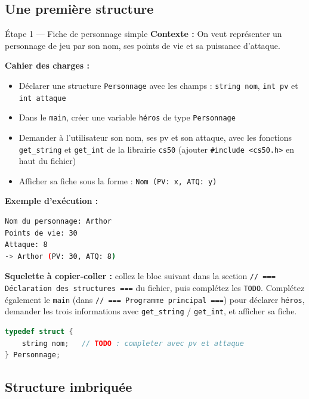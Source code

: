 \subsection{Une première structure}

\begin{UPSTIManipulation}{Étape 1 — Fiche de personnage simple}
  \textbf{Contexte :} On veut représenter un personnage de jeu par son nom, ses points de vie
  et sa puissance d'attaque.

  \textbf{Cahier des charges :}
  \begin{itemize}
    \item Déclarer une structure \texttt{Personnage} avec les champs : \texttt{string nom},
      \texttt{int pv} et \texttt{int attaque}
    \item Dans le \texttt{main}, créer une variable \texttt{héros} de type \texttt{Personnage}
    \item Demander à l'utilisateur son nom, ses pv et son attaque, avec les fonctions
      \texttt{get\_string} et \texttt{get\_int} de la librairie \texttt{cs50} (ajouter
      \texttt{\#include <cs50.h>} en haut du fichier)
    \item Afficher sa fiche sous la forme : \texttt{Nom (PV: x, ATQ: y)}
  \end{itemize}

  \textbf{Exemple d'exécution :}
  \begin{lstlisting}[language=bash]
Nom du personnage: Arthor
Points de vie: 30
Attaque: 8
-> Arthor (PV: 30, ATQ: 8)
  \end{lstlisting}

  \textbf{Squelette à copier-coller :} collez le bloc suivant dans la section
  \texttt{// === Déclaration des structures ===} du fichier, puis complétez les \texttt{TODO}.
  Complétez également le \texttt{main} (dans \texttt{// === Programme principal ===}) pour
  déclarer \texttt{héros}, demander les trois informations avec \texttt{get\_string} /
  \texttt{get\_int}, et afficher sa fiche.

  \begin{lstlisting}[language=C]
typedef struct {
    string nom;   // TODO : completer avec pv et attaque
} Personnage;
  \end{lstlisting}

\end{UPSTIManipulation}

\subsection{Structure imbriquée}

